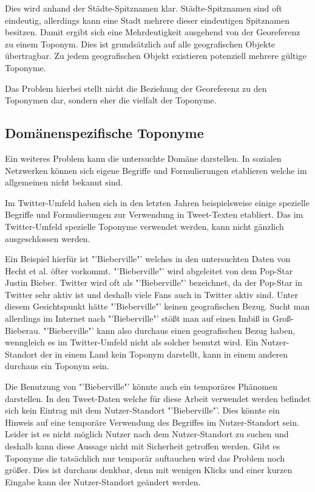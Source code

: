 					Dies wird anhand der Städte-Spitznamen klar. 
					Städte-Spitznamen sind oft eindeutig, allerdings kann eine Stadt mehrere dieser eindeutigen Spitznamen besitzen. 
					Damit ergibt sich eine Mehrdeutigkeit ausgehend von der Georeferenz zu einem Toponym.
					Dies ist grundsätzlich auf alle geografischen Objekte übertragbar.
					Zu jedem geografischen Objekt existieren potenziell mehrere gültige Toponyme.

					Das Problem hierbei stellt nicht die Beziehung der Georeferenz zu den Toponymen dar, sondern eher die vielfalt der Toponyme. 

		\subsection{Domänenspezifische Toponyme} 

			Ein weiteres Problem kann die untersuchte Domäne darstellen. 
			In sozialen Netzwerken können sich eigene Begriffe und Formulierungen etablieren welche im allgemeinen nicht bekannt sind.

			Im Twitter-Umfeld haben sich in den letzten Jahren beispielsweise einige spezielle Begriffe und Formulierungen zur Verwendung in Tweet-Texten etabliert. 
			Das im Twitter-Umfeld spezielle Toponyme verwendet werden, kann nicht gänzlich ausgeschlossen werden. 

			Ein Beispiel hierfür ist "'Bieberville"' welches in den untersuchten Daten von Hecht et al. öfter vorkommt.
			"'Bieberville"' wird abgeleitet von dem Pop-Star Justin Bieber.	
			Twitter wird oft als "'Bieberville"' bezeichnet, da der Pop-Star in Twitter sehr aktiv ist und deshalb viele Fans auch in Twitter aktiv sind.
			Unter diesem Gesichtspunkt hätte "'Bieberville"' keinen geografischen Bezug.
			Sucht man allerdings im Internet nach "'Bieberville"' stößt man auf einen Imbiß in Groß-Bieberau.
			"'Bieberville"' kann also durchaus einen geografischen Bezug haben, wenngleich es im Twitter-Umfeld nicht als solcher benutzt wird. 
			Ein Nutzer-Standort der in einem Land kein Toponym darstellt, kann in einem anderen durchaus ein Toponym sein.

			Die Benutzung von "'Bieberville"' könnte auch ein temporäres Phänomen darstellen. 
			In den Tweet-Daten welche für diese Arbeit verwendet werden befindet sich kein Eintrag mit dem Nutzer-Standort "'Bieberville"'.
			Dies könnte ein Hinweis auf eine temporäre Verwendung des Begriffes im Nutzer-Standort sein.
			Leider ist es nicht möglich Nutzer nach dem Nutzer-Standort zu suchen und deshalb kann diese Aussage nicht mit Sicherheit getroffen werden. 
			Gibt es Toponyme die tatsächlich nur temporär auftauchen wird das Problem noch größer. 
			Dies ist durchaus denkbar, denn mit wenigen Klicks und einer kurzen Eingabe kann der Nutzer-Standort geändert werden.

